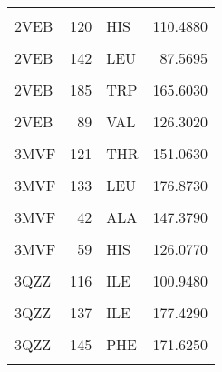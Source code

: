 \begin{table}
\begin{tabular}{lrlr}
			\cellcolor{gray!6}{2VEB} & \cellcolor{gray!6}{116} & \cellcolor{gray!6}{ILE} & \cellcolor{gray!6}{101.7820}\\
			2VEB & 120 & HIS & 110.4880\\
			\cellcolor{gray!6}{2VEB} & \cellcolor{gray!6}{137} & \cellcolor{gray!6}{ILE} & \cellcolor{gray!6}{179.1050}\\
			\addlinespace
			2VEB & 142 & LEU & 87.5695\\
			\cellcolor{gray!6}{2VEB} & \cellcolor{gray!6}{145} & \cellcolor{gray!6}{PHE} & \cellcolor{gray!6}{170.3740}\\
			2VEB & 185 & TRP & 165.6030\\
			\cellcolor{gray!6}{2VEB} & \cellcolor{gray!6}{74} & \cellcolor{gray!6}{PHE} & \cellcolor{gray!6}{96.7886}\\
			2VEB & 89 & VAL & 126.3020\\
			\addlinespace
			\cellcolor{gray!6}{2VEB} & \cellcolor{gray!6}{93} & \cellcolor{gray!6}{PHE} & \cellcolor{gray!6}{112.4610}\\
			3MVF & 121 & THR & 151.0630\\
			\cellcolor{gray!6}{3MVF} & \cellcolor{gray!6}{123} & \cellcolor{gray!6}{LEU} & \cellcolor{gray!6}{147.9850}\\
			3MVF & 133 & LEU & 176.8730\\
			\cellcolor{gray!6}{3MVF} & \cellcolor{gray!6}{40} & \cellcolor{gray!6}{TYR} & \cellcolor{gray!6}{155.4560}\\
			\addlinespace
			3MVF & 42 & ALA & 147.3790\\
			\cellcolor{gray!6}{3MVF} & \cellcolor{gray!6}{57} & \cellcolor{gray!6}{LEU} & \cellcolor{gray!6}{143.0050}\\
			3MVF & 59 & HIS & 126.0770\\
			\cellcolor{gray!6}{3MVF} & \cellcolor{gray!6}{68} & \cellcolor{gray!6}{PHE} & \cellcolor{gray!6}{102.8610}\\
			3QZZ & 116 & ILE & 100.9480\\
			\addlinespace
			\cellcolor{gray!6}{3QZZ} & \cellcolor{gray!6}{120} & \cellcolor{gray!6}{HIS} & \cellcolor{gray!6}{109.3460}\\
			3QZZ & 137 & ILE & 177.4290\\
			\cellcolor{gray!6}{3QZZ} & \cellcolor{gray!6}{142} & \cellcolor{gray!6}{LEU} & \cellcolor{gray!6}{83.8050}\\
			3QZZ & 145 & PHE & 171.6250\\
			\cellcolor{gray!6}{3QZZ} & \cellcolor{gray!6}{185} & \cellcolor{gray!6}{TRP} & \cellcolor{gray!6}{156.0610}\\

\end{tabular}
\end{table}
